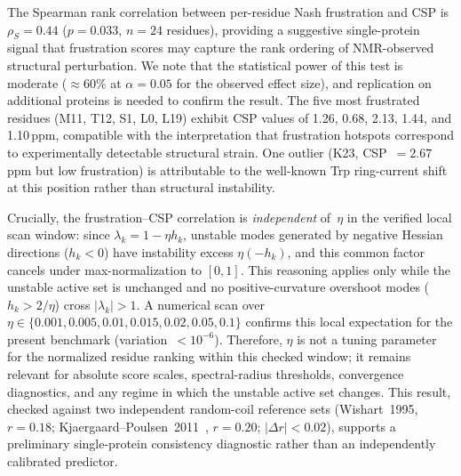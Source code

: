 \documentclass[12pt,a4paper]{article}
\theoremstyle{remark}
\begin{document}
The Spearman rank correlation between per-residue Nash frustration and CSP is $\rho_S = 0.44$ ($p = 0.033$, $n = 24$ residues), providing a suggestive single-protein signal that frustration scores may capture the rank ordering of NMR-observed structural perturbation. We note that the statistical power of this test is moderate ($\approx 60\%$ at $\alpha = 0.05$ for the observed effect size), and replication on additional proteins is needed to confirm the result. The five most frustrated residues (M11, T12, S1, L0, L19) exhibit CSP values of 1.26, 0.68, 2.13, 1.44, and 1.10\,ppm, compatible with the interpretation that frustration hotspots correspond to experimentally detectable structural strain. One outlier (K23, CSP~$= 2.67$\,ppm but low frustration) is attributable to the well-known Trp ring-current shift at this position rather than structural instability.

Crucially, the frustration--CSP correlation is \emph{independent} of~$\eta$ in the verified local scan window: since $\lambda_k = 1 - \eta h_k$, unstable modes generated by negative Hessian directions ($h_k < 0$) have instability excess $\eta(-h_k)$, and this common factor cancels under max-normalization to $[0,1]$. This reasoning applies only while the unstable active set is unchanged and no positive-curvature overshoot modes ($h_k > 2/\eta$) cross $|\lambda_k|>1$. A numerical scan over $\eta \in \{0.001, 0.005, 0.01, 0.015, 0.02, 0.05, 0.1\}$ confirms this local expectation for the present benchmark (variation~$< 10^{-6}$). Therefore, $\eta$ is not a tuning parameter for the normalized residue ranking within this checked window; it remains relevant for absolute score scales, spectral-radius thresholds, convergence diagnostics, and any regime in which the unstable active set changes. This result, checked against two independent random-coil reference sets (Wishart~1995, $r = 0.18$; Kjaergaard--Poulsen~2011~\cite{KjaergaardPoulsen2011}, $r = 0.20$; $|\Delta r| < 0.02$), supports a preliminary single-protein consistency diagnostic rather than an independently calibrated predictor.
\end{document}
